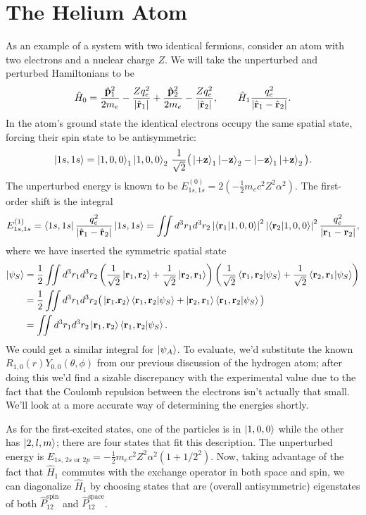 \documentclass[../p116main.tex]{subfiles}
\begin{document}
\section{The Helium Atom}
As an example of a system with two identical fermions, consider an atom with two electrons and a nuclear charge $Z$.
We will take the unperturbed and perturbed Hamiltonians to be
\[ \hat H_0 = \frac{\hat{\mathbf{p}}_1^2}{2m_e} - \frac{Zq_e^2}{|\hat{\mathbf{r}}_1|} + \frac{\hat{\mathbf{p}}_2^2}{2m_e} - \frac{Zq_e^2}{|\hat{\mathbf{r}}_2|}, \qquad \hat H_1 \frac{q_e^2}{|\hat{\mathbf{r}}_1 - \hat{\mathbf{r}}_2|}. \]
In the atom's ground state the identical electrons occupy the same spatial state, forcing their spin state to be antisymmetric:
\[ \left| 1s, 1s \right> = \left| 1,0,0 \right>_1 \left| 1,0,0 \right>_2 \, \frac{1}{\sqrt{2}} \big( \left| +\mathbf{z} \right>_1 \left| -\mathbf{z} \right>_2 - \left| -\mathbf{z} \right>_1\left| +\mathbf{z} \right>_2 \big). \]
The unperturbed energy is known to be $E_{1s, 1s}^{(0)} = 2(-\frac{1}{2} m_e c^2 Z^2 \alpha^2)$.
The first-order shift is the integral
\[ E_{1s,1s}^{(1)} = \left< 1s,1s \right| \frac{q_e^2}{|\hat{\mathbf{r}}_1 - \hat{\mathbf{r}}_2|} \left| 1s,1s \right> = \iint d^3 r_1 d^3 r_2 \left| \left< \mathbf{r}_1 \middle| 1,0,0 \right> \right|^2 \left| \left< \mathbf{r}_2 \middle| 1,0,0 \right> \right|^2 \frac{q_e^2}{|\mathbf{r}_1 - \mathbf{r}_2|}, \]
where we have inserted the symmetric spatial state
\begin{align*}
    \left| \psi_S \right> &= \frac{1}{2} \iint d^3 r_1 d^3 r_2 \left( \frac{1}{\sqrt{2}} \left| \mathbf{r}_1, \mathbf{r}_2 \right> + \frac{1}{\sqrt{2}} \left| \mathbf{r}_2, \mathbf{r}_1 \right> \right) \left( \frac{1}{\sqrt{2}} \left< \mathbf{r}_1, \mathbf{r}_2 \middle| \psi_S \right> + \frac{1}{\sqrt{2}} \left< \mathbf{r}_2, \mathbf{r}_1 \middle| \psi_S \right> \right) \\
    &= \frac{1}{2} \iint d^3 r_1 d^3 r_2 \big( \left| \mathbf{r}_1. \mathbf{r}_2 \right> \left< \mathbf{r}_1, \mathbf{r}_2 \middle| \psi_S \right> + \left| \mathbf{r}_2, \mathbf{r}_1 \right> \left< \mathbf{r}_1, \mathbf{r}_2 \middle| \psi_S \right> \big) \\
    &= \iint d^3 r_1 d^3 r_2 \left| \mathbf{r}_1, \mathbf{r}_2 \right> \left< \mathbf{r}_1, \mathbf{r}_2 \middle| \psi_S \right>.
\end{align*}
We could get a similar integral for $\left| \psi_A \right>$.
To evaluate, we'd substitute the known $R_{1,0}(r) Y_{0,0}(\theta,\phi)$ from our previous discussion of the hydrogen atom; after doing this we'd find a sizable discrepancy with the experimental value due to the fact that the Coulomb repulsion between the electrons isn't actually that small.
We'll look at a more accurate way of determining the energies shortly.

As for the first-excited states, one of the particles is in $\left| 1,0,0 \right>$ while the other has $\left| 2,l,m \right>$; there are four states that fit this description.
The unperturbed energy is $E_{1s, \, 2s \text{ or } 2p} = -\frac{1}{2} m_e c^2 Z^2 \alpha^2 (1 + 1 / 2^2)$.
Now, taking advantage of the fact that $\hat H_1$ commutes with the exchange operator in both space and spin, we can diagonalize $\hat H_1$ by choosing states that are (overall antisymmetric) eigenstates of both $\hat P_{12}^\textrm{spin}$ and $\hat P_{12}^\textrm{space}$.
\end{document}
